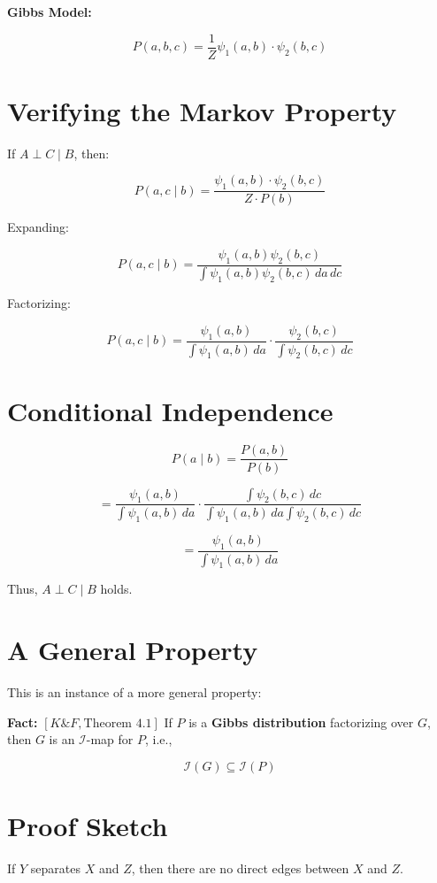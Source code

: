 \documentclass{article}%
\begin{document}
\textbf{Gibbs Model:}

\[
P(a,b,c) = \frac{1}{Z} \psi_1(a,b) \cdot \psi_2(b,c)
\]

\section*{Verifying the Markov Property}

If \( A \perp C \mid B \), then:

\[
P(a,c \mid b) = \frac{\psi_1(a,b) \cdot \psi_2(b,c)}{Z \cdot P(b)}
\]

Expanding:

\[
P(a,c \mid b) = \frac{\psi_1(a,b) \psi_2(b,c)}{\int \psi_1(a,b) \psi_2(b,c) \, da \, dc}
\]

Factorizing:

\[
P(a,c \mid b) = \frac{\psi_1(a,b)}{\int \psi_1(a,b) \, da} \cdot \frac{\psi_2(b,c)}{\int \psi_2(b,c) \, dc}
\]

\section*{Conditional Independence}

\[
P(a \mid b) = \frac{P(a,b)}{P(b)}
\]

\[
= \frac{\psi_1(a,b)}{\int \psi_1(a,b) \, da} \cdot \frac{\int \psi_2(b,c) \, dc}{\int \psi_1(a,b) \, da \int \psi_2(b,c) \, dc}
\]

\[
= \frac{\psi_1(a,b)}{\int \psi_1(a,b) \, da}
\]

Thus, \( A \perp C \mid B \) holds.


\section*{A General Property}

This is an instance of a more general property:

\textbf{Fact:} \([ K \& F, \text{Theorem 4.1} ]\) If \( P \) is a \textbf{Gibbs distribution} factorizing over \( G \), then \( G \) is an \(\mathcal{I}\)-map for \( P \), i.e.,

\[
\mathcal{I}(G) \subseteq \mathcal{I}(P)
\]

\section*{Proof Sketch}

If \( Y \) separates \( X \) and \( Z \), then there are no direct edges between \( X \) and \( Z \).
\end{document}
